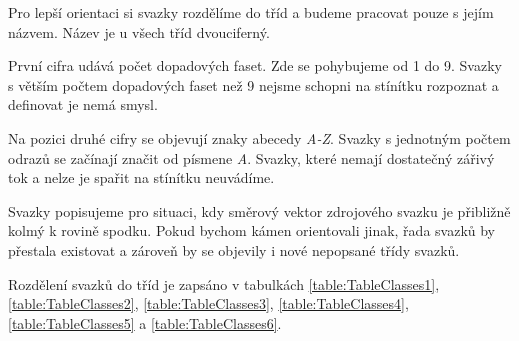  Pro lepší orientaci si svazky rozdělíme do tříd a budeme pracovat pouze s jejím názvem. Název je u všech tříd dvouciferný.
 
  První cifra udává počet dopadových faset. Zde se pohybujeme od 1 do 9. Svazky s větším počtem dopadových faset než 9 nejsme schopni na stínítku rozpoznat a definovat je nemá smysl. 
  
 Na pozici druhé cifry se objevují znaky abecedy \textit{A-Z}. Svazky s jednotným počtem odrazů se začínají značit od písmene \textit{A}. Svazky, které nemají dostatečný zářivý tok a nelze je spařit na stínítku neuvádíme. 
  
  Svazky popisujeme pro situaci, kdy směrový vektor zdrojového svazku je přibližně kolmý k rovině spodku. Pokud bychom kámen orientovali jinak, řada svazků by přestala existovat a zároveň by se objevily i nové nepopsané třídy svazků. 
  
  Rozdělení svazků do tříd je zapsáno v tabulkách \ref{table:TableClasses1}, \ref{table:TableClasses2}, \ref{table:TableClasses3}, \ref{table:TableClasses4}, \ref{table:TableClasses5} a \ref{table:TableClasses6}.
  
